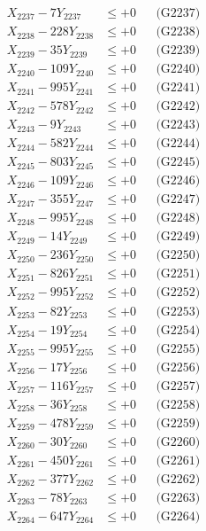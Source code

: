 \documentclass[a4paper,10pt]{article}
\begin{document}
{\begin{align}
X_{2237} - 7Y_{2237} &\leq +0 && \text{(G2237)} \\
X_{2238} - 228Y_{2238} &\leq +0 && \text{(G2238)} \\
X_{2239} - 35Y_{2239} &\leq +0 && \text{(G2239)} \\
X_{2240} - 109Y_{2240} &\leq +0 && \text{(G2240)} \\
\allowbreak
X_{2241} - 995Y_{2241} &\leq +0 && \text{(G2241)} \\
X_{2242} - 578Y_{2242} &\leq +0 && \text{(G2242)} \\
X_{2243} - 9Y_{2243} &\leq +0 && \text{(G2243)} \\
X_{2244} - 582Y_{2244} &\leq +0 && \text{(G2244)} \\
X_{2245} - 803Y_{2245} &\leq +0 && \text{(G2245)} \\
X_{2246} - 109Y_{2246} &\leq +0 && \text{(G2246)} \\
X_{2247} - 355Y_{2247} &\leq +0 && \text{(G2247)} \\
X_{2248} - 995Y_{2248} &\leq +0 && \text{(G2248)} \\
X_{2249} - 14Y_{2249} &\leq +0 && \text{(G2249)} \\
X_{2250} - 236Y_{2250} &\leq +0 && \text{(G2250)} \\
\allowbreak
X_{2251} - 826Y_{2251} &\leq +0 && \text{(G2251)} \\
X_{2252} - 995Y_{2252} &\leq +0 && \text{(G2252)} \\
X_{2253} - 82Y_{2253} &\leq +0 && \text{(G2253)} \\
X_{2254} - 19Y_{2254} &\leq +0 && \text{(G2254)} \\
X_{2255} - 995Y_{2255} &\leq +0 && \text{(G2255)} \\
X_{2256} - 17Y_{2256} &\leq +0 && \text{(G2256)} \\
X_{2257} - 116Y_{2257} &\leq +0 && \text{(G2257)} \\
X_{2258} - 36Y_{2258} &\leq +0 && \text{(G2258)} \\
X_{2259} - 478Y_{2259} &\leq +0 && \text{(G2259)} \\
X_{2260} - 30Y_{2260} &\leq +0 && \text{(G2260)} \\
\allowbreak
X_{2261} - 450Y_{2261} &\leq +0 && \text{(G2261)} \\
X_{2262} - 377Y_{2262} &\leq +0 && \text{(G2262)} \\
X_{2263} - 78Y_{2263} &\leq +0 && \text{(G2263)} \\
X_{2264} - 647Y_{2264} &\leq +0 && \text{(G2264)} \\

\end{align}}
\end{document}
